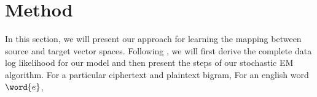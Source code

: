 \section{Method}
In this section, we will present our approach for learning the mapping between source and target vector spaces. Following \cite{mimno2012topic}, we will first derive the complete data log likelihood for our model and then present the steps of our stochastic EM algorithm. For a particular ciphertext and plaintext bigram, For an english word $\word{e}$,